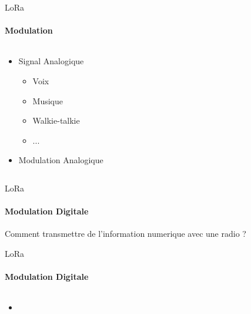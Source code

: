 \begin{frame}{LoRa}
\framesubtitle{Modulation}
\begin{columns}
\begin{column}{0.5\textwidth}
\begin{itemize}
  \item Signal Analogique
  \begin{itemize}
    \item Voix
    \item Musique
    \item Walkie-talkie
    \item ...
  \end{itemize}
  \item Modulation Analogique
  \begin{itemize}
  \end{itemize}
\end{itemize}  
\end{column}
\begin{column}{0.5\textwidth}

\end{column}
\end{columns}


\end{frame}

\begin{frame}{LoRa}
\framesubtitle{Modulation Digitale}

\begin{block}{}
{
Comment transmettre de l'information numerique avec une radio ?
}
\end{block}

\end{frame}

\begin{frame}{LoRa}
\framesubtitle{Modulation Digitale}

\begin{columns}
\begin{column}{0.5\textwidth}
\begin{itemize}
  \item
\end{itemize}  
\end{column}
\begin{column}{0.5\textwidth}
  
\end{column}
\end{columns}
\end{frame}

